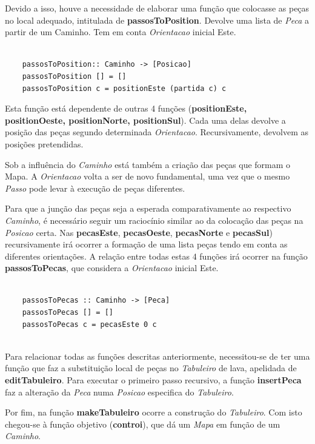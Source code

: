 \documentclass[a4paper]{report} %
\begin{document}
Devido a isso, houve a necessidade de elaborar uma função que colocasse as peças no local adequado, intitulada de \textbf{passosToPosition}. Devolve uma lista de \emph{Peca} a partir de um Caminho. Tem em conta \emph{Orientacao} inicial Este.

\begin{verbatim}
    
    passosToPosition:: Caminho -> [Posicao]
    passosToPosition [] = []
    passosToPosition c = positionEste (partida c) c

\end{verbatim}

Esta função está dependente de  outras 4 funções (\textbf{positionEste, positionOeste, positionNorte, positionSul}). Cada uma delas devolve a posição das peças segundo determinada \emph{Orientacao}. Recursivamente, devolvem as posições pretendidas.

Sob a influência do \emph{Caminho} está também a criação das peças que formam o Mapa. A \emph{Orientacao} volta a ser de novo fundamental, uma vez que o mesmo \emph{Passo} pode levar à execução de peças diferentes.

Para que a junção das peças seja a esperada comparativamente ao respectivo \emph{Caminho}, é necessário seguir um raciocínio similar ao da colocação das peças na \emph{Posicao} certa. Nas \textbf{pecasEste}, \textbf{pecasOeste}, \textbf{pecasNorte} e \textbf{pecasSul}) recursivamente irá ocorrer a formação de uma lista peças tendo em conta as diferentes orientações. A relação entre todas estas 4 funções irá ocorrer na função \textbf{passosToPecas}, que considera a \emph{Orientacao} inicial Este.

\begin{verbatim}
    
    passosToPecas :: Caminho -> [Peca]
    passosToPecas [] = []
    passosToPecas c = pecasEste 0 c
 
\end{verbatim}

Para relacionar todas as funções descritas anteriormente, necessitou-se de ter uma função que faz a substituição local de peças no \emph{Tabuleiro} de lava, apelidada de \textbf{editTabuleiro}. Para executar o primeiro passo recursivo, a função \textbf{insertPeca} faz a alteração da \emph{Peca} numa \emph{Posicao} especifica do \emph{Tabuleiro}.

Por fim, na função \textbf{makeTabuleiro} ocorre a construção do \emph{Tabuleiro}. Com isto chegou-se à função objetivo (\textbf{controi}), que dá um \emph{Mapa} em função de um \emph{Caminho}.
\end{document}

